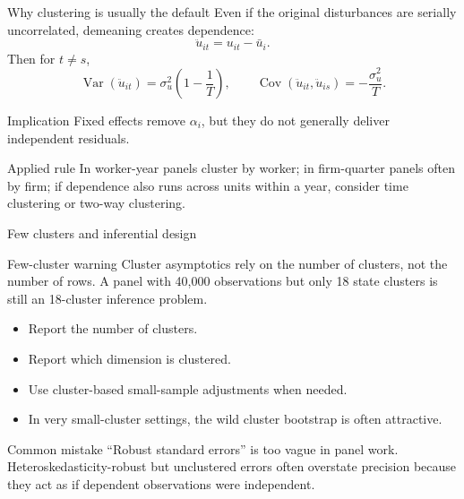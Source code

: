 \documentclass[10pt]{beamer}
\DeclareMathOperator{\Cov}{Cov}
\DeclareMathOperator{\Var}{Var}
\begin{document}
\begin{frame}{Why clustering is usually the default}
\label{slide:demeanedcorr}
\small
Even if the original disturbances are serially uncorrelated, demeaning creates dependence:
\[
\ddot{u}_{it} = u_{it} - \bar{u}_i.
\]
Then for $t \neq s$,
\[
\Var(\ddot{u}_{it}) = \sigma_u^2\left(1-\frac{1}{T}\right),
\qquad
\Cov(\ddot{u}_{it}, \ddot{u}_{is}) = -\frac{\sigma_u^2}{T}.
\]

\pause
\begin{block}{Implication}
Fixed effects remove $\alpha_i$, but they do not generally deliver independent residuals.
\end{block}

\pause
\begin{alertblock}{Applied rule}
In worker-year panels cluster by worker; in firm-quarter panels often by firm; if dependence also runs across units within a year, consider time clustering or two-way clustering.
\end{alertblock}

\hfill\hyperlink{app:demeanedproof}{}
\end{frame}

\begin{frame}{Few clusters and inferential design}
\label{slide:fewclusters}
\small
\begin{block}{Few-cluster warning}
Cluster asymptotics rely on the number of clusters, not the number of rows. A panel with 40,000 observations but only 18 state clusters is still an 18-cluster inference problem.
\end{block}

\pause
\begin{itemize}
  \item Report the number of clusters.
  \item Report which dimension is clustered.
  \item Use cluster-based small-sample adjustments when needed.
  \item In very small-cluster settings, the wild cluster bootstrap is often attractive.
\end{itemize}

\pause
\begin{alertblock}{Common mistake}
``Robust standard errors'' is too vague in panel work. Heteroskedasticity-robust but unclustered errors often overstate precision because they act as if dependent observations were independent.
\end{alertblock}
\end{frame}
\end{document}
